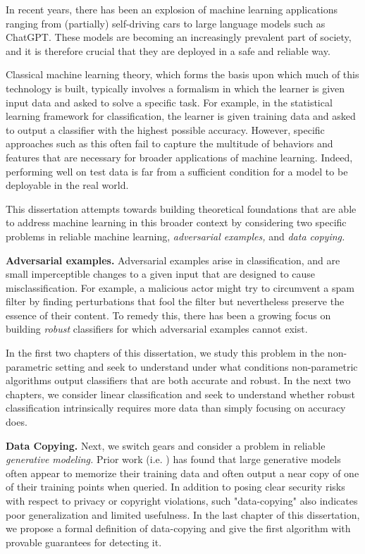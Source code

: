 In recent years, there has been an explosion of machine learning applications ranging from (partially) self-driving cars to large language models such as ChatGPT. These models are becoming an increasingly prevalent part of society, and it is therefore crucial that they are deployed in a safe and reliable way.

Classical machine learning theory, which forms the basis upon which much of this technology is built, typically involves a formalism in which the learner is given input data and asked to solve a specific task. For example, in the statistical learning framework for classification, the learner is given training data and asked to output a classifier with the highest possible accuracy. However, specific approaches such as this often fail to capture the multitude of behaviors and features that are necessary for broader applications of machine learning. Indeed, performing well on test data is far from a sufficient condition for a model to be deployable in the real world. 

This dissertation attempts towards building theoretical foundations that are able to address machine learning in this broader context by considering two specific problems in reliable machine learning, \textit{adversarial examples,} and \textit{data copying.}


\textbf{Adversarial examples.} Adversarial examples arise in classification, and are small imperceptible changes to a given input that are designed to cause misclassification. For example, a malicious actor might try to circumvent a spam filter by finding perturbations that fool the filter but nevertheless preserve the essence of their content. To remedy this, there has been a growing focus on building \textit{robust} classifiers for which adversarial examples cannot exist.

In the first two chapters of this dissertation, we study this problem in the non-parametric setting and seek to understand under what conditions non-parametric algorithms output classifiers that are both accurate and robust. In the next two chapters, we consider linear classification and seek to understand whether robust classification intrinsically requires more data than simply focusing on accuracy does.

\textbf{Data Copying.} Next, we switch gears and consider a problem in reliable \textit{generative modeling.} Prior work (i.e. \cite{lopez2016revisiting,XHYGSWK18}) has found that large generative models often appear to memorize their training data and often output a near copy of one of their training points when queried. In addition to posing clear security risks with respect to privacy or copyright violations, such "data-copying" also indicates poor generalization and limited usefulness. In the last chapter of this dissertation, we propose a formal definition of data-copying and give the first algorithm with provable guarantees for detecting it. 



